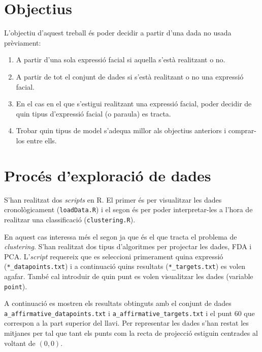 \documentclass[a4paper]{article}
\begin{document}
\section{Objectius}

L'objectiu d'aquest treball és poder decidir a partir d'una dada no usada prèviament:
\begin{enumerate}
	\item A partir d'una sola expressió facial si aquella s'està realitzant o no.
	\item A partir de tot el conjunt de dades si s'està realitzant o no una expressió facial.
	\item En el cas en el que s'estigui realitzant una expressió facial, poder decidir de quin tipus d'expressió facial (o paraula) es tracta.
	\item Trobar quin tipus de model s'adequa millor als objectius anteriors i comprar-los entre ells.
\end{enumerate}

\section{Procés d'exploració de dades}

S'han realitzat dos \emph{scripts} en R. El primer és per visualitzar les dades cronològicament (\verb|loadData.R|) i el segon és per poder interpretar-les a l'hora de realitzar una classificació (\verb|clustering.R|).

En aquest cas interessa més el segon ja que és el que tracta el problema de \emph{clustering}. S'han realitzat dos tipus d'algoritmes\cite{bishop} per projectar les dades, FDA i PCA. L'\emph{script} requereix que es seleccioni primerament quina expressió (\verb|*_datapoints.txt|) i a continuació quins resultats (\verb|*_targets.txt|) es volen agafar. També cal introduir de quin punt es volen visualitzar les dades (variable \verb|point|). 

A continuació es mostren els resultats obtinguts amb el conjunt de dades \verb|a_affirmative_datapoints.txt| i \verb|a_affirmative_targets.txt| i el punt 60 que correspon a la part superior del llavi. Per representar les dades s'han restat les mitjanes per tal que tant els punts com la recta de projecció estiguin centrades al voltant de $(0,0)$.
\end{document}
